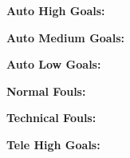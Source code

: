 \documentclass{article}
\begin{document}
{%
\noindent\begin{minipage}{.1\linewidth} %
	\begin{center}
		\textbf{Auto \linebreak High \linebreak Goals:} \\[1em]
	\end{center}
\end{minipage}
\begin{minipage}{.1\linewidth} %
	\begin{center}
		\textbf{Auto \linebreak Medium \linebreak Goals:} \\[1em]
	\end{center}
\end{minipage}
\begin{minipage}{.1\linewidth} %
	\begin{center}
		\textbf{Auto \linebreak Low \linebreak Goals:} \\[1em]
	\end{center}
\end{minipage}
\hfill
\begin{minipage}{.1\linewidth} %
	\begin{center}
		\textbf{Normal \linebreak Fouls: \linebreak} \\[1em]
	\end{center}
\end{minipage}
\begin{minipage}{.1\linewidth} %
	\begin{center}
		\textbf{Technical \linebreak Fouls: \linebreak} \\[1em]
	\end{center}
\end{minipage}
\hfill
\begin{minipage}{.1\linewidth} %
	\begin{center}
		\textbf{Tele \linebreak High \linebreak Goals:} \\[1em]

\end{center}
\end{minipage}}
\end{document}

